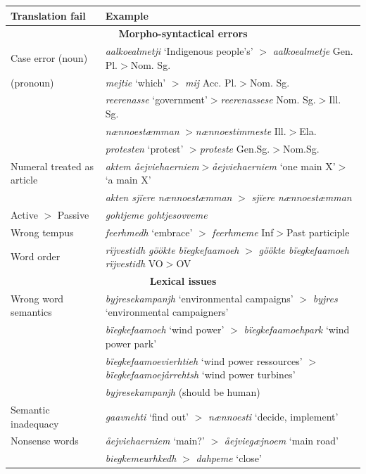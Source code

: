 \documentclass[free]{flammie}
\begin{document}
\begin{table}[htb]
\begin{center}
\begin{tabularx}{0.8\pagewidth}{lX}
\toprule
\bf Translation fail & \bf Example \\
\midrule
\multicolumn{2}{|c|}{\bf Morpho-syntactical errors} \\
\midrule
Case error (noun) &	\textit{aalkoealmetji} `Indigenous people's'  $>$ \textit{aalkoealmetje} Gen. Pl.$>$Nom. Sg. \\
(pronoun) &	\textit{mejtie} `which' $>$ \textit{mij} Acc. Pl.$>$Nom. Sg.  \\
  &	\textit{reerenasse} `government'$>$\textit{reerenassese} Nom. Sg.$>$Ill. Sg.  \\
   &	\textit{nænnoestæmman} $>$\textit{nænnoestimmeste} Ill.$>$Ela.  \\
    &\textit{protesten} `protest' $>$\textit{proteste} Gen.Sg.$>$Nom.Sg.  \\
Numeral treated as article & \textit{aktem åejviehaerniem}$>$\textit{åejviehaerniem} `one main X'$>$`a main X'\\
& \textit{akten sjïere nænnoestæmman} $>$ \textit{sjïere nænnoestæmman} \\
Active $>$ Passive & \textit{gohtjeme} \textit{gohtjesovveme}\\
Wrong tempus & \textit{feerhmedh} `embrace'  $>$ \textit{feerhmeme}	 Inf$>$Past participle \\
Word order & \textit{rïjvestidh göökte bïegkefaamoeh} $>$ \textit{göökte bïegkefaamoeh rïjvestidh} VO$>$OV\\
\midrule
\multicolumn{2}{|c|}{\bf Lexical issues} \\
\midrule
Wrong word semantics & \textit{byjresekampanjh} `environmental campaigns' $>$  \textit{byjres} `environmental campaigners' \\
& \textit{bïegkefaamoeh} `wind power' $>$ \textit{bïegkefaamoehpark}  `wind power park' \\
& \textit{bïegkefaamoevierhtieh} `wind power ressources' $>$\textit{bïegkefaamoejårrehtsh} `wind power turbines'\\
& \textit{byjresekampanjh} (should be human)  \\
Semantic inadequacy & \textit{gaavnehti} `find out' $>$ \textit{nænnoesti} `decide, implement' \\
Nonsense words & \textit{åejviehaerniem} `main?' $>$ \textit{åejviegæjnoem} `main road' \\
 & \textit{biegkemeurhkedh} $>$ \textit{dahpeme} `close' \\

\end{tabularx}
\end{center}
\end{table}
\end{document}
